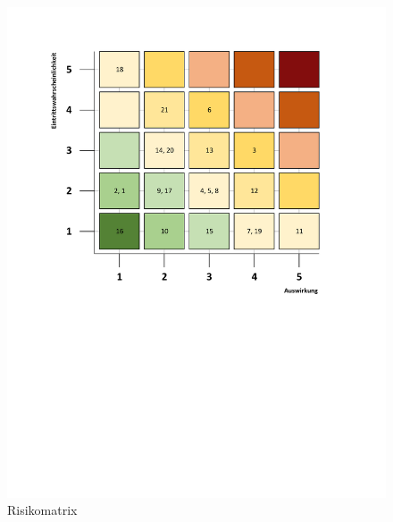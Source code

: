 \begin{figure}[h]
	\centering
	\includegraphics[width=0.85\linewidth]{img/Risikomatrix}
	\caption{Risikomatrix}
	\label{fig:risikomatrix}
\end{figure}


